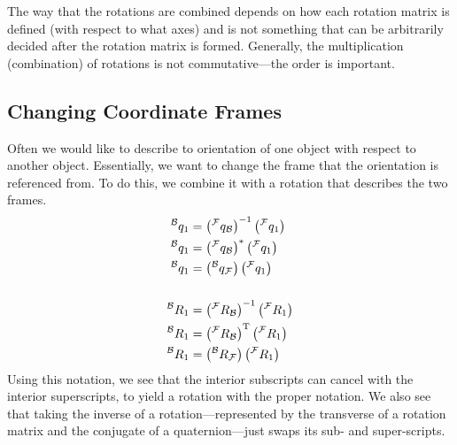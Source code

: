 \documentclass[letterpaper,10pt]{article}
\newcommand\leftidx[3]{%
  {\vphantom{#2}}#1#2#3%
}
\begin{document}
The way that the rotations are combined depends on how each rotation matrix is defined (with respect to what axes) and is not something that can be arbitrarily decided after the rotation matrix is formed. Generally, the multiplication (combination) of rotations is not commutative---the order is important.


\subsection{Changing Coordinate Frames}
Often we would like to describe to orientation of one object with respect to another object. Essentially, we want to change the frame that the orientation is referenced from. To do this, we combine it with a rotation that describes the two frames.
\begin{align}
\leftidx{^\mathcal{B}}{q}{_{1}} &= \left(\leftidx{^\mathcal{F}}{q}{_\mathcal{B}}\right)^{-1} \left(\leftidx{^\mathcal{F}}{q}{_{1}}\right) \\
\leftidx{^\mathcal{B}}{q}{_{1}} &= \left(\leftidx{^\mathcal{F}}{q}{_\mathcal{B}}\right)^* \left(\leftidx{^\mathcal{F}}{q}{_{1}}\right) \\
\leftidx{^\mathcal{B}}{q}{_{1}} &= \left(\leftidx{^\mathcal{B}}{q}{_\mathcal{F}}\right) \left(\leftidx{^\mathcal{F}}{q}{_{1}}\right) \\
\nonumber& \\
\leftidx{^\mathcal{B}}{R}{_{1}} &= \left(\leftidx{^\mathcal{F}}{R}{_\mathcal{B}}\right)^{-1} \left(\leftidx{^\mathcal{F}}{R}{_{1}}\right) \\
\leftidx{^\mathcal{B}}{R}{_{1}} &= \left(\leftidx{^\mathcal{F}}{R}{_\mathcal{B}}\right)^\mathrm{T} \left(\leftidx{^\mathcal{F}}{R}{_{1}}\right) \\
\leftidx{^\mathcal{B}}{R}{_{1}} &= \left(\leftidx{^\mathcal{B}}{R}{_\mathcal{F}}\right) \left(\leftidx{^\mathcal{F}}{R}{_{1}}\right) 
\end{align}
Using this notation, we see that the interior subscripts can cancel with the interior superscripts, to yield a rotation with the proper notation. We also see that taking the inverse of a rotation---represented by the transverse of a rotation matrix and the conjugate of a quaternion---just swaps its sub- and super-scripts.
\end{document}
